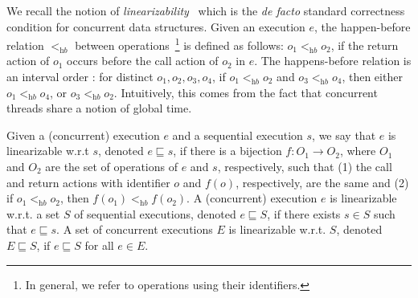 %
We recall the notion of \emph{linearizability}~\cite{journals/toplas/HerlihyW90} which is the \emph{de facto} standard correctness condition for concurrent data structures.
Given an execution $e$, the happen-before relation $<_{\textit{hb}}$ between operations~\footnote{In general, we refer to operations using their identifiers.} is defined as follows: $o_1 <_{\textit{hb}} o_2$, if the return action of $o_1$ occurs before the call action of $o_2$ in $e$. The happens-before relation is an interval order \cite{DBLP:conf/popl/BouajjaniEEH15}: for distinct $o_1,o_2,o_3,o_4$, if $o_1 <_{\textit{hb}} o_2$ and $o_3 <_{\textit{hb}} o_4$, then either $o_1 <_{\textit{hb}} o_4$, or $o_3 <_{\textit{hb}} o_2$. Intuitively, this comes from the fact that concurrent threads share a notion of global time.

Given a (concurrent) execution $e$ and a sequential execution $s$, we say that $e$ is linearizable w.r.t $s$, denoted $e \sqsubseteq s$, if there is a bijection $f: O_1 \rightarrow O_2$, where $O_1$ and $O_2$ are the set of operations of $e$ and $s$, respectively, such that (1) the call and return actions with identifier $o$ and $f(o)$, respectively, are the same
and (2) if $o_1 <_{\textit{hb}} o_2$, then $f(o_1) <_{\textit{hb}} f(o_2)$.
A (concurrent) execution $e$ is linearizable w.r.t. a set $S$ of sequential executions, denoted $e \sqsubseteq S$, if there exists $s \in S$ such that $e \sqsubseteq s$. A set of concurrent executions $E$ is linearizable w.r.t. $S$, denoted $E \sqsubseteq S$, if $e \sqsubseteq S$ for all $e \in E$.

